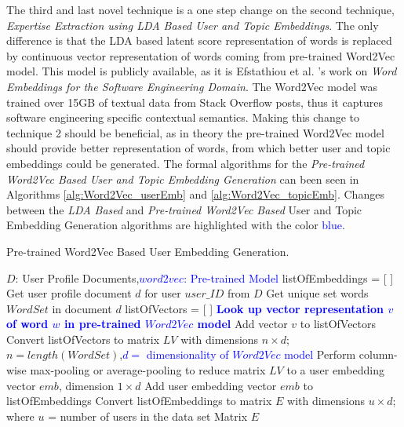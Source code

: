             The third and last novel technique is a one step change on the second technique, \emph{Expertise Extraction using LDA Based User and Topic Embeddings}. The only difference is that the LDA based latent score representation of words is replaced by continuous vector representation of words coming from pre-trained Word2Vec model. This model is publicly available, as it is Efstathiou et al. \cite{efstathiou2018word}'s work on \emph{Word Embeddings for the Software Engineering Domain}. The Word2Vec model \cite{mikolov2013efficient} was trained over 15GB of textual data from Stack Overflow posts, thus it captures software engineering specific contextual semantics. Making this change to technique 2 should be beneficial, as in theory the pre-trained Word2Vec model should provide better representation of words, from which better user and topic embeddings could be generated. The formal algorithms for the \emph{Pre-trained Word2Vec Based User and Topic Embedding Generation} can been seen in Algorithms \ref{alg:Word2Vec_userEmb} and \ref{alg:Word2Vec_topicEmb}. Changes between the \emph{LDA Based} and \emph{Pre-trained Word2Vec Based} User and Topic Embedding Generation algorithms are highlighted with the color \textcolor{blue}{blue}. 
        
            \begin{algorithm}
            \caption{Pre-trained Word2Vec Based User Embedding Generation.}
            \label{alg:Word2Vec_userEmb}
            \begin{algorithmic}[1]
                \REQUIRE $D$: User Profile Documents,\textcolor{blue}{$word2vec$: Pre-trained Model}
                \STATE listOfEmbeddings = [ ]
                    \STATE Get user profile document $d$ for user $user\_ID$ from $D$
                    \STATE Get unique set words $WordSet$ in document $d$
                    \STATE listOfVectors = [ ]
                    \STATE
                        \STATE \textbf{\textcolor{blue}{Look up vector representation $v$ of word $w$ in pre-trained $Word2Vec$ model}}
                        \STATE Add vector $v$ to listOfVectors
                    \ENDFOR
                    \STATE Convert listOfVectors to matrix $LV$ with dimensions $n \times d$; $n=length(WordSet)$,\textcolor{blue}{$d=$ dimensionality of $Word2Vec$ model}
                    \STATE Perform column-wise max-pooling or average-pooling to reduce matrix $LV$ to a user embedding vector $emb$, dimension $1 \times d$
                    \STATE Add user embedding vector $emb$ to listOfEmbeddings
                \ENDFOR
                \STATE Convert listOfEmbeddings to matrix $E$ with dimensions $u \times d$; where $u$ = number of users in the data set
                \RETURN Matrix $E$
            \end{algorithmic}
            \end{algorithm}
            
